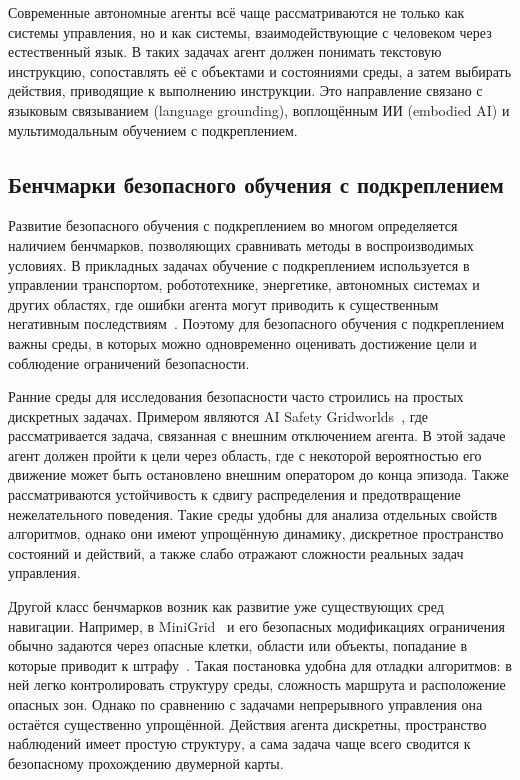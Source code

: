 Современные автономные агенты всё чаще рассматриваются не только как системы управления, но и как системы, взаимодействующие с человеком через естественный язык. В таких задачах агент должен понимать текстовую инструкцию, сопоставлять её с объектами и состояниями среды, а затем выбирать действия, приводящие к выполнению инструкции. Это направление связано с языковым связыванием (language grounding), воплощённым ИИ (embodied AI) и мультимодальным обучением с подкреплением.

\subsection{Бенчмарки безопасного обучения с подкреплением}
\label{subsec:safe_rl_benchmarks}

Развитие безопасного обучения с подкреплением во многом определяется наличием бенчмарков, позволяющих сравнивать методы в воспроизводимых условиях. В прикладных задачах обучение с подкреплением используется в управлении транспортом, робототехнике, энергетике, автономных системах и других областях, где ошибки агента могут приводить к существенным негативным последствиям~\cite{campbell2010autonomous,liang2019traffic,wei2017energy,kayhan2023scheduling}. Поэтому для безопасного обучения с подкреплением важны среды, в которых можно одновременно оценивать достижение цели и соблюдение ограничений безопасности.

Ранние среды для исследования безопасности часто строились на простых дискретных задачах. Примером являются AI Safety Gridworlds~\cite{leike2017safety_gridworlds}, где рассматривается задача, связанная с внешним отключением агента. В этой задаче агент должен пройти к цели через область, где с некоторой вероятностью его движение может быть остановлено внешним оператором до конца эпизода. Также рассматриваются устойчивость к сдвигу распределения и предотвращение нежелательного поведения. Такие среды удобны для анализа отдельных свойств алгоритмов, однако они имеют упрощённую динамику, дискретное пространство состояний и действий, а также слабо отражают сложности реальных задач управления.

Другой класс бенчмарков возник как развитие уже существующих сред навигации. Например, в MiniGrid~\cite{chevalier2024minigrid} и его безопасных модификациях ограничения обычно задаются через опасные клетки, области или объекты, попадание в которые приводит к штрафу~\cite{wachi2021safe,wachi2024safe_exploration}. Такая постановка удобна для отладки алгоритмов: в ней легко контролировать структуру среды, сложность маршрута и расположение опасных зон. Однако по сравнению с задачами непрерывного управления она остаётся существенно упрощённой. Действия агента дискретны, пространство наблюдений имеет простую структуру, а сама задача чаще всего сводится к безопасному прохождению двумерной карты.

